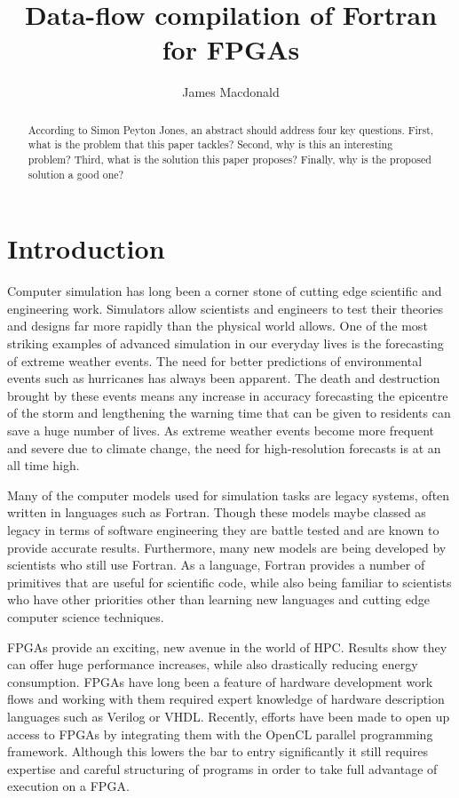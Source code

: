 \documentclass{mpaper}
\begin{document}
\title{Data-flow compilation of Fortran for FPGAs}
\author{James Macdonald}

\maketitle

\begin{abstract}
According to Simon Peyton Jones, an abstract should address
four key questions. First, what is the problem that this
paper tackles? Second, why is this an interesting problem?
Third, what is the solution this paper proposes?
Finally, why is the proposed solution a good one?
\end{abstract}

\section{Introduction}

Computer simulation has long been a corner stone of cutting edge scientific and engineering work. Simulators allow scientists and engineers to test their theories and designs far more rapidly than the physical world allows. One of the most striking examples of advanced simulation in our everyday lives is the forecasting of extreme weather events. The need for better predictions of environmental events such as hurricanes has always been apparent. The death and destruction brought by these events means any increase in accuracy forecasting the epicentre of the storm and lengthening the warning time that can be given to residents can save a huge number of lives. As extreme weather events become more frequent and severe due to climate change, the need for high-resolution forecasts is at an all time high. 

Many of the computer models used for simulation tasks are legacy systems, often written in languages such as Fortran. Though these models maybe classed as legacy in terms of software engineering they are battle tested and are known to provide accurate results. Furthermore, many new models are being developed by scientists who still use Fortran. As a language, Fortran provides a number of primitives that are useful for scientific code, while also being familiar to scientists who have other priorities other than learning new languages and cutting edge computer science techniques.

FPGAs provide an exciting, new avenue in the world of HPC. Results show they can offer huge performance increases, while also drastically reducing energy consumption. FPGAs have long been a feature of hardware development work flows and working with them required expert knowledge of hardware description languages such as Verilog or VHDL. Recently, efforts have been made to open up access to FPGAs by integrating them with the OpenCL parallel programming framework. Although this lowers the bar to entry significantly it still requires expertise and careful structuring of programs in order to take full advantage of execution on a FPGA. 
\end{document}
